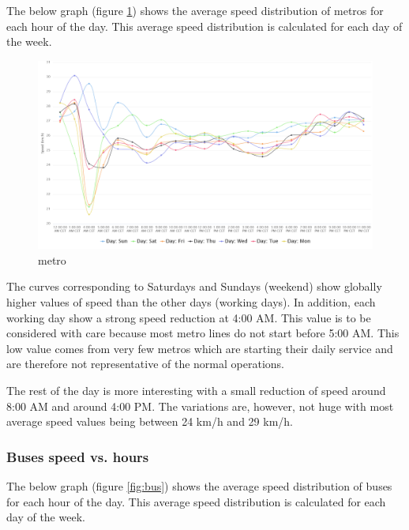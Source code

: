 \documentclass{article}
\begin{document}
The below graph (figure \ref{fig:metro}) shows the average speed distribution of metros for each hour of the day. This average speed distribution is calculated for each day of the week.

\begin{figure}[H]
    \centering
    \includegraphics[width=\textwidth]{images/Speed_day_hour_m.png} 
    \caption{metro}
    \label{fig:metro}
\end{figure}

The curves corresponding to Saturdays and Sundays (weekend) show globally higher values of speed than the other days (working days). In addition, each working day show a strong speed reduction at 4:00 AM. This value is to be considered with care because most metro lines do not start before 5:00 AM. This low value comes from very few metros which are starting their daily service and are therefore not representative of the normal operations.

The rest of the day is more interesting with a small reduction of speed around 8:00 AM and around 4:00 PM. The variations are, however, not huge with most average speed values being between 24 km/h and 29 km/h.

\subsubsection{Buses speed vs. hours}

The below graph (figure \ref{fig:bus}) shows the average speed distribution of buses for each hour of the day. This average speed distribution is calculated for each day of the week.
\end{document}
